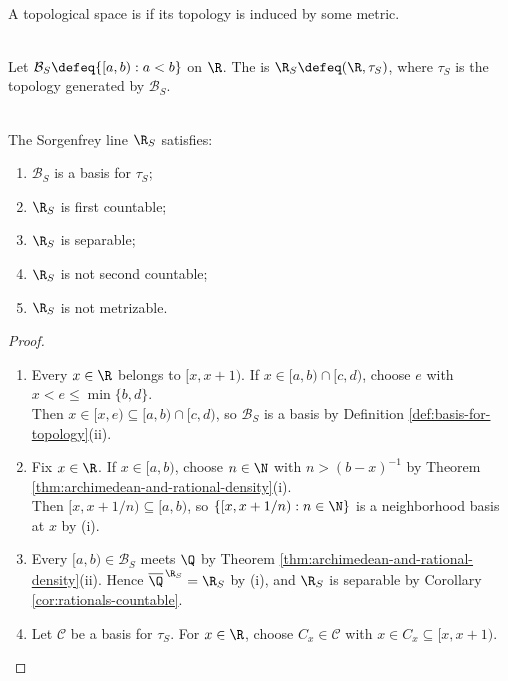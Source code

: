 \begin{definition} \label{def:metrizable-topological-space} \\
A topological space is  if its topology is induced by some metric.
\end{definition}

\begin{definition} \label{def:sorgenfrey-line} \\
Let $\mathcal{B}_S\defeq\{[a,b):a<b\}$ on $\R$. The  is $\R_S\defeq(\R,\tau_S)$, where $\tau_S$ is the topology generated by $\mathcal{B}_S$.
\end{definition}

\begin{counterexample} \label{cex:sorgenfrey-first-separable-not-second-countable} \\
The Sorgenfrey line $\R_S$ satisfies:
\begin{enumerate}[label=(\roman*)]
\setlength{\itemsep}{0pt}
\item $\mathcal{B}_S$ is a basis for $\tau_S$;
\item $\R_S$ is first countable;
\item $\R_S$ is separable;
\item $\R_S$ is not second countable;
\item $\R_S$ is not metrizable.
\end{enumerate}
\begin{proof}
\begin{enumerate}[label=(\roman*)]
\setlength{\itemsep}{0pt}
\item Every $x\in\R$ belongs to $[x,x+1)$. If $x\in[a,b)\cap[c,d)$, choose $e$ with $x<e\leq\min\{b,d\}$.\\
Then $x\in[x,e)\subseteq[a,b)\cap[c,d)$, so $\mathcal{B}_S$ is a basis by Definition \ref{def:basis-for-topology}(ii).
\item Fix $x\in\R$. If $x\in[a,b)$, choose $n\in\N$ with $n>(b-x)^{-1}$ by Theorem \ref{thm:archimedean-and-rational-density}(i).\\
Then $[x,x+1/n)\subseteq[a,b)$, so $\{[x,x+1/n):n\in\N\}$ is a neighborhood basis at $x$ by (i).
\item Every $[a,b)\in\mathcal{B}_S$ meets $\Q$ by Theorem \ref{thm:archimedean-and-rational-density}(ii). Hence $\overline{\Q}^{\,\R_S}=\R_S$ by (i), and $\R_S$ is separable by Corollary \ref{cor:rationals-countable}.
\item Let $\mathcal{C}$ be a basis for $\tau_S$. For $x\in\R$, choose $C_x\in\mathcal{C}$ with $x\in C_x\subseteq[x,x+1)$.\\

\end{enumerate}
\end{proof}
\end{counterexample}
